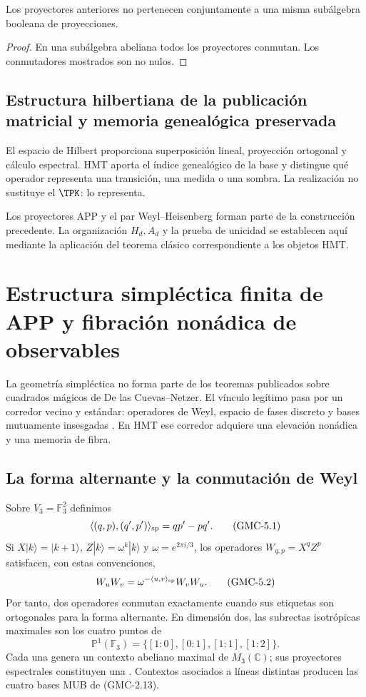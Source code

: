 \begin{proposition}
Los proyectores anteriores no pertenecen conjuntamente a una misma
subálgebra booleana de proyecciones.
\end{proposition}

\begin{proof}
En una subálgebra abeliana todos los proyectores conmutan. Los conmutadores
mostrados son no nulos.
\end{proof}

\subsection{Estructura hilbertiana de la publicación matricial y memoria genealógica preservada}

El espacio de Hilbert proporciona superposición lineal, proyección ortogonal
y cálculo espectral. HMT aporta el índice genealógico de la base y distingue
qué operador representa una transición, una medida o una sombra. La
realización no sustituye el \(\TPK\): lo representa.

\begin{sourcebox}
Los proyectores APP y el par Weyl--Heisenberg forman parte de la construcción
precedente. La organización \(H_d,A_d\) y la prueba de unicidad se establecen
aquí mediante la aplicación del teorema clásico correspondiente a los objetos
HMT.
\end{sourcebox}


\section{Estructura simpléctica finita de APP y fibración nonádica de observables}
\label{p12-83-c2-s4:gmc:chap:simplectica}

La geometría simpléctica no forma parte de los teoremas publicados sobre
cuadrados mágicos de De las Cuevas--Netzer. El vínculo legítimo pasa por un
corredor vecino y estándar: operadores de Weyl, espacio de fases discreto y
bases mutuamente insesgadas \citep{gibbons2004phase,planat2007rings}. En HMT
ese corredor adquiere una elevación nonádica y una memoria de fibra.

\subsection{La forma alternante y la conmutación de Weyl}

Sobre $V_3=\mathbb F_3^2$ definimos
\[
 \langle(q,p),(q',p')\rangle_{\rm sp}=qp'-pq'.
 \tag{GMC-5.1}
\]
Si $X|k\rangle=|k+1\rangle$,
$Z|k\rangle=\omega^k|k\rangle$ y $\omega=e^{2\pi i/3}$, los operadores
$W_{q,p}=X^qZ^p$ satisfacen, con estas convenciones,
\[
 W_uW_v=\omega^{-\langle u,v\rangle_{\rm sp}}W_vW_u.
 \tag{GMC-5.2}
\]
Por tanto, dos operadores conmutan exactamente cuando sus etiquetas son
ortogonales para la forma alternante. En dimensión dos, las subrectas
isotrópicas maximales son los cuatro puntos de
\[
 \mathbb P^1(\mathbb F_3)=\{[1:0],[0:1],[1:1],[1:2]\}.
 \tag{GMC-5.3}
\]
Cada una genera un contexto abeliano maximal de $M_3(\mathbb C)$; sus
proyectores espectrales constituyen una \PVM. Contextos asociados a líneas
distintas producen las cuatro bases MUB de \textup{(GMC-2.13)}.

